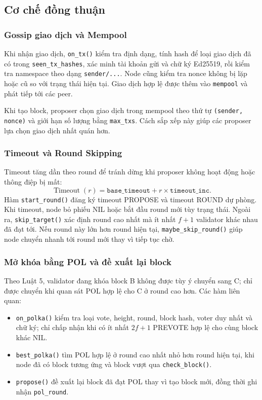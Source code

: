 \subsection{Cơ chế đồng thuận}

\subsubsection{Gossip giao dịch và Mempool}

Khi nhận giao dịch, \texttt{on\_tx()} kiểm tra định dạng, tính hash để loại giao dịch đã có trong \texttt{seen\_tx\_hashes}, xác minh tài khoản gửi và chữ ký Ed25519, rồi kiểm tra namespace theo dạng \texttt{sender/...}. Node cũng kiểm tra nonce không bị lặp hoặc cũ so với trạng thái hiện tại. Giao dịch hợp lệ được thêm vào \texttt{mempool} và phát tiếp tới các peer.

Khi tạo block, proposer chọn giao dịch trong mempool theo thứ tự \texttt{(sender, nonce)} và giới hạn số lượng bằng \texttt{max\_txs}. Cách sắp xếp này giúp các proposer lựa chọn giao dịch nhất quán hơn.

\subsubsection{Timeout và Round Skipping}

Timeout tăng dần theo round để tránh dừng khi proposer không hoạt động hoặc thông điệp bị mất:
\[
\operatorname{Timeout}(r)=\texttt{base\_timeout}+r\times\texttt{timeout\_inc}.
\]
Hàm \texttt{start\_round()} đăng ký timeout PROPOSE và timeout ROUND dự phòng. Khi timeout, node bỏ phiếu NIL hoặc bắt đầu round mới tùy trạng thái. Ngoài ra, \texttt{skip\_target()} xác định round cao nhất mà ít nhất $f+1$ validator khác nhau đã đạt tới. Nếu round này lớn hơn round hiện tại, \texttt{maybe\_skip\_round()} giúp node chuyển nhanh tới round mới thay vì tiếp tục chờ.

\subsubsection{Mở khóa bằng POL và đề xuất lại block}

Theo Luật 5, validator đang khóa block B không được tùy ý chuyển sang C; chỉ được chuyển khi quan sát POL hợp lệ cho C ở round cao hơn. Các hàm liên quan:
\begin{itemize}
    \item \texttt{on\_polka()} kiểm tra loại vote, height, round, block hash, voter duy nhất và chữ ký; chỉ chấp nhận khi có ít nhất $2f+1$ PREVOTE hợp lệ cho cùng block khác NIL.
    \item \texttt{best\_polka()} tìm POL hợp lệ ở round cao nhất nhỏ hơn round hiện tại, khi node đã có block tương ứng và block vượt qua \texttt{check\_block()}.
    \item \texttt{propose()} đề xuất lại block đã đạt POL thay vì tạo block mới, đồng thời ghi nhận \texttt{pol\_round}.
\end{itemize}

